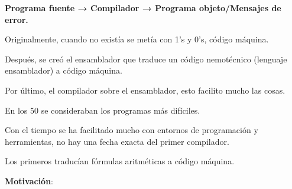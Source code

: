 \documentclass[12pt, twoside, openright]{report} %
\begin{document}
\begin{figure}[H]
{}
\end{figure}

\textbf{Programa fuente → Compilador → Programa objeto/Mensajes de
error.}

Originalmente, cuando no existía se metía con 1's y 0's, código máquina.

Después, se creó el ensamblador que traduce un código nemotécnico
(lenguaje ensamblador) a código máquina.

Por último, el compilador sobre el ensamblador, esto facilito mucho las
cosas.

En los 50 se consideraban los programas más difíciles.

Con el tiempo se ha facilitado mucho con entornos de programación y
herramientas, no hay una fecha exacta del primer compilador.

Los primeros traducían fórmulas aritméticas a código máquina.

\textbf{Motivación}:
\end{document}
